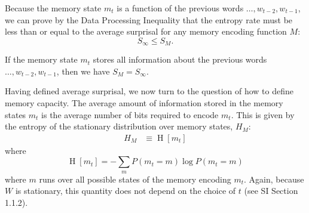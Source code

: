  Because the memory state $m_t$ is a function of the previous words $ \dots, w_{t-2}, w_{t-1}$, we can prove by the Data Processing Inequality \citep[][pp. 34--35]{cover2006elements} that the entropy rate must be less than or equal to the average surprisal for any memory encoding function $M$:
\begin{equation*}
    S_\infty \le S_M.
\end{equation*}



If the memory state $m_t$ stores all information about the previous words $ \dots, w_{t-2}, w_{t-1}$, then we have $S_M = S_\infty$.

Having defined average surprisal, we now turn to the question of how to define memory capacity. The average amount of information stored in the memory states $m_t$ is the average number of bits required to encode $m_t$. 
This is given by the entropy of the stationary distribution over memory states, $H_M$: %
\begin{align}
    \nonumber
        H_M &\equiv \operatorname{H}[m_t] 
\end{align}
where
\begin{equation*}
    \operatorname{H}[m_t] = - \sum_m P(m_t = m) \log P(m_t=m)
\end{equation*}
where $m$ runs over all possible states of the memory encoding $m_t$.
Again, because $W$ is stationary, this quantity does not depend on the choice of $t$ (see SI Section 1.1.2). 

